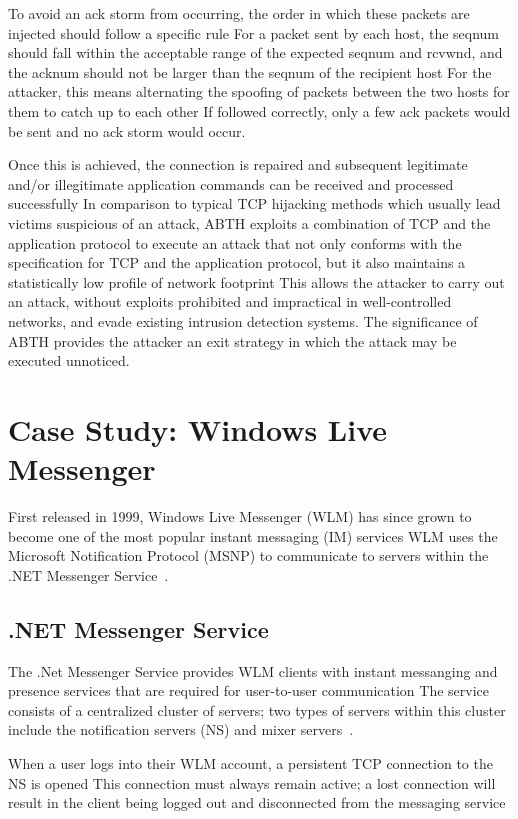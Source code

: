 \documentclass{sig-alternate}
\begin{document}
To avoid an ack storm from occurring, the order in which these packets are injected should follow a specific rule
For a packet sent by each host, the seqnum should fall within the acceptable range of the expected seqnum and rcvwnd, and the acknum should not be larger than the seqnum of the recipient host
For the attacker, this means alternating the spoofing of packets between the two hosts for them to catch up to each other
If followed correctly, only a few ack packets would be sent and no ack storm would occur.

Once this is achieved, the connection is repaired and subsequent legitimate and/or illegitimate application commands can be received and processed successfully
In comparison to typical TCP hijacking methods which usually lead victims suspicious of an attack, ABTH exploits a combination of TCP and the application protocol to execute an attack that not only conforms with the specification for TCP and the application protocol, but it also maintains a statistically low profile of network footprint
This allows the attacker to carry out an attack, without exploits prohibited and impractical in well-controlled networks, and evade existing intrusion detection systems.
The significance of ABTH provides the attacker an exit strategy in which the attack may be executed unnoticed.

\section{Case Study: Windows Live Messenger}

First released in 1999, Windows Live Messenger (WLM) has since grown to become one of the most popular instant messaging (IM) services
WLM uses the Microsoft Notification Protocol (MSNP) to communicate to servers within the .NET Messenger Service~\cite{piccard:imsecurity}.

\subsection{.NET Messenger Service}

The .Net Messenger Service provides WLM clients with instant messanging and presence services that are required for user-to-user communication
The service consists of a centralized cluster of servers; two types of servers within this cluster include the notification servers (NS) and mixer servers~\cite{torre:wlm}.

When a user logs into their WLM account, a persistent TCP connection to the NS is opened
This connection must always remain active; a lost connection will result in the client being logged out and disconnected from the messaging service
\end{document}
